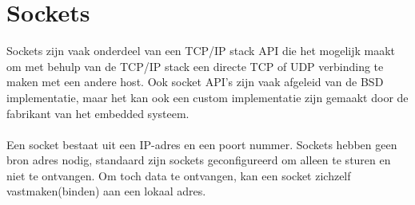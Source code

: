 \documentclass[../DCM2_Verslag.tex]{subfiles}
\begin{document}
\section{Sockets}
Sockets zijn vaak onderdeel van een TCP/IP stack API die het mogelijk maakt om met behulp van de TCP/IP stack een directe TCP of UDP verbinding te maken met een andere host. Ook socket API's zijn vaak afgeleid van de BSD implementatie, maar het kan ook een custom implementatie zijn gemaakt door de fabrikant van het embedded systeem. 
\\\\
Een socket bestaat uit een IP-adres en een poort nummer. Sockets hebben geen bron adres nodig, standaard zijn sockets geconfigureerd om alleen te sturen en niet te ontvangen. Om toch data te ontvangen, kan een socket zichzelf vastmaken(binden) aan een lokaal adres.
\end{document}
